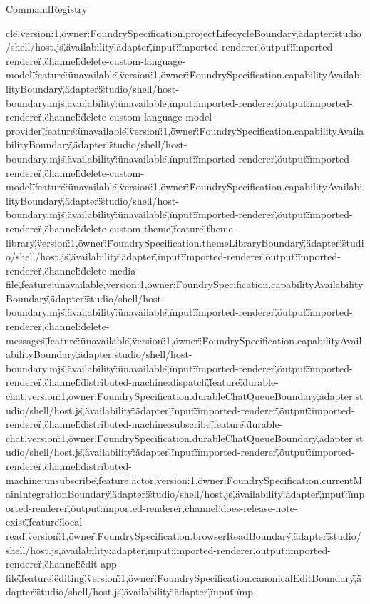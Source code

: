 \begin{lexlean}{CommandRegistry}
\begin{semanticmodule}
{cle\",\"version\":1,\"owner\":\"FoundrySpecification.projectLifecycleBoundary\",\"adapter\":\"studio/shell/host.js\",\"availability\":\"adapter\",\"input\":\"imported-renderer\",\"output\":\"imported-renderer\"},{\"channel\":\"delete-custom-language-model\",\"feature\":\"unavailable\",\"version\":1,\"owner\":\"FoundrySpecification.capabilityAvailabilityBoundary\",\"adapter\":\"studio/shell/host-boundary.mjs\",\"availability\":\"unavailable\",\"input\":\"imported-renderer\",\"output\":\"imported-renderer\"},{\"channel\":\"delete-custom-language-model-provider\",\"feature\":\"unavailable\",\"version\":1,\"owner\":\"FoundrySpecification.capabilityAvailabilityBoundary\",\"adapter\":\"studio/shell/host-boundary.mjs\",\"availability\":\"unavailable\",\"input\":\"imported-renderer\",\"output\":\"imported-renderer\"},{\"channel\":\"delete-custom-model\",\"feature\":\"unavailable\",\"version\":1,\"owner\":\"FoundrySpecification.capabilityAvailabilityBoundary\",\"adapter\":\"studio/shell/host-boundary.mjs\",\"availability\":\"unavailable\",\"input\":\"imported-renderer\",\"output\":\"imported-renderer\"},{\"channel\":\"delete-custom-theme\",\"feature\":\"theme-library\",\"version\":1,\"owner\":\"FoundrySpecification.themeLibraryBoundary\",\"adapter\":\"studio/shell/host.js\",\"availability\":\"adapter\",\"input\":\"imported-renderer\",\"output\":\"imported-renderer\"},{\"channel\":\"delete-media-file\",\"feature\":\"unavailable\",\"version\":1,\"owner\":\"FoundrySpecification.capabilityAvailabilityBoundary\",\"adapter\":\"studio/shell/host-boundary.mjs\",\"availability\":\"unavailable\",\"input\":\"imported-renderer\",\"output\":\"imported-renderer\"},{\"channel\":\"delete-messages\",\"feature\":\"unavailable\",\"version\":1,\"owner\":\"FoundrySpecification.capabilityAvailabilityBoundary\",\"adapter\":\"studio/shell/host-boundary.mjs\",\"availability\":\"unavailable\",\"input\":\"imported-renderer\",\"output\":\"imported-renderer\"},{\"channel\":\"distributed-machine:dispatch\",\"feature\":\"durable-chat\",\"version\":1,\"owner\":\"FoundrySpecification.durableChatQueueBoundary\",\"adapter\":\"studio/shell/host.js\",\"availability\":\"adapter\",\"input\":\"imported-renderer\",\"output\":\"imported-renderer\"},{\"channel\":\"distributed-machine:subscribe\",\"feature\":\"durable-chat\",\"version\":1,\"owner\":\"FoundrySpecification.durableChatQueueBoundary\",\"adapter\":\"studio/shell/host.js\",\"availability\":\"adapter\",\"input\":\"imported-renderer\",\"output\":\"imported-renderer\"},{\"channel\":\"distributed-machine:unsubscribe\",\"feature\":\"actor\",\"version\":1,\"owner\":\"FoundrySpecification.currentMainIntegrationBoundary\",\"adapter\":\"studio/shell/host.js\",\"availability\":\"adapter\",\"input\":\"imported-renderer\",\"output\":\"imported-renderer\"},{\"channel\":\"does-release-note-exist\",\"feature\":\"local-read\",\"version\":1,\"owner\":\"FoundrySpecification.browserReadBoundary\",\"adapter\":\"studio/shell/host.js\",\"availability\":\"adapter\",\"input\":\"imported-renderer\",\"output\":\"imported-renderer\"},{\"channel\":\"edit-app-file\",\"feature\":\"editing\",\"version\":1,\"owner\":\"FoundrySpecification.canonicalEditBoundary\",\"adapter\":\"studio/shell/host.js\",\"availability\":\"adapter\",\"input\":\"imp}
\end{semanticmodule}
\end{lexlean}
